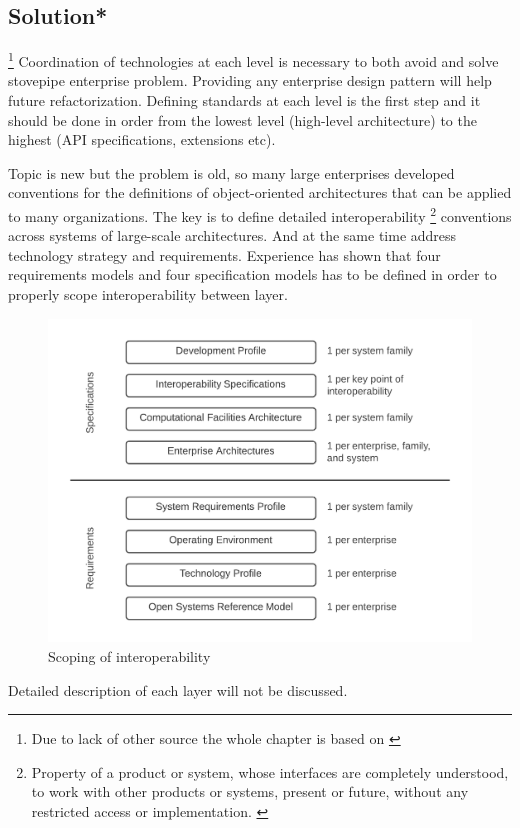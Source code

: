 \newpage
\subsection[Solution]{Solution*}

\footnote{Due to lack of other source the whole chapter is based on \cite{SurvivalGuide}}
Coordination of technologies at each level is necessary to both avoid and solve stovepipe enterprise problem. Providing any enterprise design pattern will help future refactorization. Defining standards at each level is the first step and it should be done in order from the lowest level (high-level architecture) to the highest (API specifications, extensions etc).

Topic is new but the problem is old, so many large enterprises developed conventions for the definitions of object-oriented architectures that can be applied to many organizations. The key is to define detailed interoperability \footnote{Property of a product or system, whose interfaces are completely understood, to work with other products or systems, present or future, without any restricted access or implementation. \cite{Interoperability}} conventions across systems of large-scale architectures. And at the same time address technology strategy and requirements. Experience has shown that four requirements models and four specification models has to be defined in order to properly scope interoperability between layer.

\begin{figure}[!h]
    \centering
    \includegraphics[scale=0.3]{Images/enterprisesolution.png}
    \caption[Scoping of interoperability]{Scoping of interoperability \cite{SurvivalGuide}}
    \label{fig:ScopingOfInteroperability}
\end{figure}
Detailed description of each layer will not be discussed.


